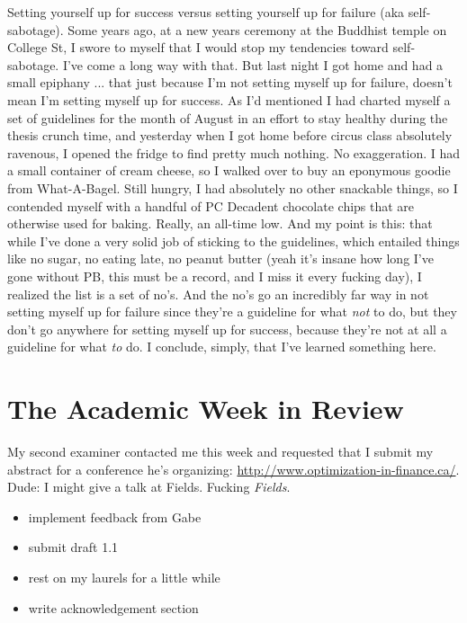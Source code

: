 \documentclass[12pt]{article}
\begin{document}
Setting yourself up for success versus setting yourself up for failure (aka self-sabotage). Some years ago, at a new years ceremony at the Buddhist temple on College St, I swore to myself that I would stop my tendencies toward self-sabotage. I've come a long way with that. But last night I got home and had a small epiphany ... that just because I'm not setting myself up for failure, doesn't mean I'm setting myself up for success. As I'd mentioned I had charted myself a set of guidelines for the month of August in an effort to stay healthy during the thesis crunch time, and yesterday when I got home before circus class absolutely ravenous, I opened the fridge to find pretty much nothing. No exaggeration. I had a small container of cream cheese, so I walked over to buy an eponymous goodie from What-A-Bagel. Still hungry, I had absolutely no other snackable things, so I contended myself with a handful of PC Decadent chocolate chips that are otherwise used for baking. Really, an all-time low. And my point is this: that while I've done a very solid job of sticking to the guidelines, which entailed things like no sugar, no eating late, no peanut butter (yeah it's insane how long I've gone without PB, this must be a record, and I miss it every fucking day), I realized the list is a set of no's. And the no's go an incredibly far way in not setting myself up for failure since they're a guideline for what \emph{not} to do, but they don't go anywhere for setting myself up for success, because they're not at all a guideline for what \emph{to} do. I conclude, simply, that I've learned something here. \par 

\section*{The Academic Week in Review}
My second examiner contacted me this week and requested that I submit my abstract for a conference he's organizing: \url{http://www.optimization-in-finance.ca/}. Dude: I might give a talk at Fields. Fucking \emph{Fields}. 

\begin{itemize}[topsep=0pt,itemsep=0ex,partopsep=0ex,parsep=0ex]
\item implement feedback from Gabe
\item submit draft 1.1
\item rest on my laurels for a little while
\item write acknowledgement section
\end{itemize}
\end{document}
